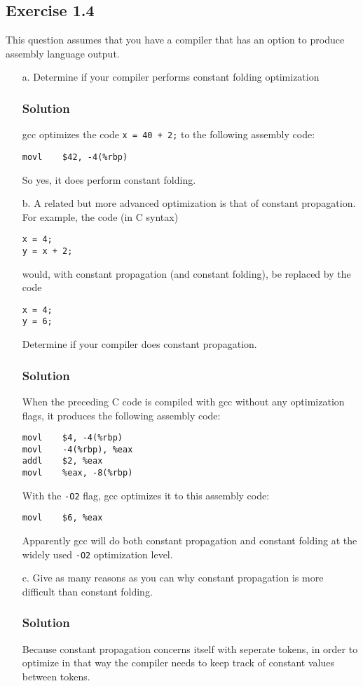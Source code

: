 \documentclass[12pt]{article}
\begin{document}
\subsection*{Exercise 1.4}
This question assumes that you have a compiler that has an option to produce assembly language output.
\begin{enumerate}

\item[a.] Determine if your compiler performs constant folding optimization
\subsubsection*{Solution}
gcc optimizes the code {\tt x = 40 + 2;} to the following assembly code:
\begin{verbatim}
movl	$42, -4(%rbp)
\end{verbatim}
So yes, it does perform constant folding.

\item[b.] A related but more advanced optimization is that of constant propagation. For example, the code (in C syntax)
\begin{verbatim}
x = 4;
y = x + 2;
\end{verbatim}
would, with constant propagation (and constant folding), be replaced by the code
\begin{verbatim}
x = 4;
y = 6;
\end{verbatim}
Determine if your compiler does constant propagation.
\subsubsection*{Solution}
When the preceding C code is compiled with gcc without any optimization flags, it produces the following assembly code:
\begin{verbatim}
movl	$4, -4(%rbp)
movl	-4(%rbp), %eax
addl	$2, %eax
movl	%eax, -8(%rbp)
\end{verbatim}
With the {\tt -O2} flag, gcc optimizes it to this assembly code:
\begin{verbatim}
movl	$6, %eax
\end{verbatim}
Apparently gcc will do both constant propagation and constant folding at the widely used {\tt -O2} optimization level.

\item[c.] Give as many reasons as you can why constant propagation is more difficult than constant folding.

\subsubsection*{Solution}
Because constant propagation concerns itself with seperate tokens, in order to optimize in that way the compiler needs to keep track of constant values between tokens.


\end{enumerate}
\end{document}
